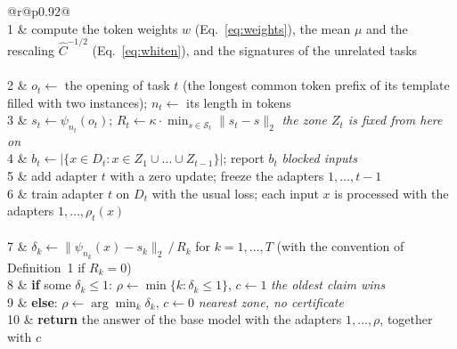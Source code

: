 \begin{algorithm}
  \caption{The certified switch}
  \label{alg:switch}
  \small
  \begin{tabular}{@{}r@{\hspace{0.8em}}p{0.92\linewidth}@{}}
     \\[1pt]
    1 & compute the token weights $w$ (Eq.~\ref{eq:weights}), the mean $\mu$ and the rescaling $\hat{C}^{-1/2}$ (Eq.~\ref{eq:whiten}), and the
        signatures of the unrelated tasks \\[4pt]
     \\[1pt]
    2 & $o_t \leftarrow$ the opening of task $t$ (the longest common token prefix of its template filled with two instances); \quad $n_t \leftarrow$ its length in tokens \\
    3 & $s_t \leftarrow \psi_{n_t}(o_t)$; \quad $R_t \leftarrow \kappa \cdot \min_{s \in \mathcal{S}_t} \lVert s_t - s \rVert_2$
        \hfill \emph{the zone $Z_t$ is fixed from here on} \\
    4 & $b_t \leftarrow \bigl|\{x \in D_t : x \in Z_1 \cup \dots \cup Z_{t-1}\}\bigr|$; \quad report $b_t$
        \hfill \emph{blocked inputs} \\
    5 & add adapter $t$ with a zero update; freeze the adapters $1, \dots, t-1$ \\
    6 & train adapter $t$ on $D_t$ with the usual loss; each input $x$ is processed with the adapters $1, \dots, \rho_t(x)$ \\[4pt]
     \\[1pt]
    7 & $\delta_k \leftarrow \lVert \psi_{n_k}(x) - s_k \rVert_2 \,/\, R_k$ \quad for $k = 1, \dots, T$ \quad (with the convention of Definition~1 if $R_k = 0$) \\
    8 & \textbf{if} some $\delta_k \le 1$: \quad $\rho \leftarrow \min\{k : \delta_k \le 1\}$, \quad $c \leftarrow 1$
        \hfill \emph{the oldest claim wins} \\
    9 & \textbf{else}: \quad $\rho \leftarrow \arg\min_k \delta_k$, \quad $c \leftarrow 0$
        \hfill \emph{nearest zone, no certificate} \\
    10 & \textbf{return} the answer of the base model with the adapters $1, \dots, \rho$, together with $c$ \\
  \end{tabular}
\end{algorithm}

